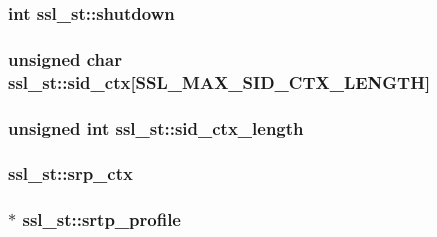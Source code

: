 \hypertarget{structssl__st_a12a82cfd124852a54354a46012bdd502}{
\subsubsection[{shutdown}]{\setlength{\rightskip}{0pt plus 5cm}int ssl\-\_\-st\-::shutdown}}\label{structssl__st_a12a82cfd124852a54354a46012bdd502}
\hypertarget{structssl__st_a486ddbf462473285440234c69568b9ce}{
\subsubsection[{sid\-\_\-ctx}]{\setlength{\rightskip}{0pt plus 5cm}unsigned char ssl\-\_\-st\-::sid\-\_\-ctx\mbox{[}{\bf S\-S\-L\-\_\-\-M\-A\-X\-\_\-\-S\-I\-D\-\_\-\-C\-T\-X\-\_\-\-L\-E\-N\-G\-T\-H}\mbox{]}}}\label{structssl__st_a486ddbf462473285440234c69568b9ce}
\hypertarget{structssl__st_a7b63f375f11b5232a5dff69e26f6a438}{
\subsubsection[{sid\-\_\-ctx\-\_\-length}]{\setlength{\rightskip}{0pt plus 5cm}unsigned int ssl\-\_\-st\-::sid\-\_\-ctx\-\_\-length}}\label{structssl__st_a7b63f375f11b5232a5dff69e26f6a438}
\hypertarget{structssl__st_aaef9c47543427df406b33888d147f65d}{
\subsubsection[{srp\-\_\-ctx}]{ ssl\-\_\-st\-::srp\-\_\-ctx}}\label{structssl__st_aaef9c47543427df406b33888d147f65d}
\hypertarget{structssl__st_ae8776b7b0b446fb823d9f87176bcfa1d}{
\subsubsection[{srtp\-\_\-profile}]{$\ast$ ssl\-\_\-st\-::srtp\-\_\-profile}}\label{structssl__st_ae8776b7b0b446fb823d9f87176bcfa1d}
